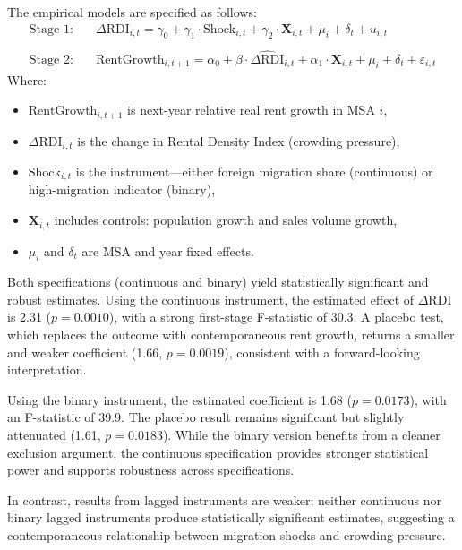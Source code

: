 \documentclass[APA,Times1COL]{WileyNJDv5} %
\begin{document}
The empirical models are specified as follows:
\begin{align*}
	\text{Stage 1:} \quad & \Delta \text{RDI}_{i,t} = \gamma_0 + \gamma_1 \cdot \text{Shock}_{i,t} + \gamma_2 \cdot \mathbf{X}_{i,t} + \mu_i + \delta_t + u_{i,t} \\\\
	\text{Stage 2:} \quad & \text{RentGrowth}_{i,t+1} = \alpha_0 + \beta \cdot \widehat{\Delta \text{RDI}}_{i,t} + \alpha_1 \cdot \mathbf{X}_{i,t} + \mu_i + \delta_t + \varepsilon_{i,t}
\end{align*}
Where:
\begin{itemize}
	\item $\text{RentGrowth}_{i,t+1}$ is next-year relative real rent growth in MSA $i$,
	\item $\Delta \text{RDI}_{i,t}$ is the change in Rental Density Index (crowding pressure),
	\item $\text{Shock}_{i,t}$ is the instrument—either foreign migration share (continuous) or high-migration indicator (binary),
	\item $\mathbf{X}_{i,t}$ includes controls: population growth and sales volume growth,
	\item $\mu_i$ and $\delta_t$ are MSA and year fixed effects.
\end{itemize}


Both specifications (continuous and binary) yield statistically significant and robust estimates. Using the continuous instrument, the estimated effect of \(\Delta \text{RDI}\) is 2.31 (\(p = 0.0010\)), with a strong first-stage F-statistic of 30.3. A placebo test, which replaces the outcome with contemporaneous rent growth, returns a smaller and weaker coefficient (1.66, \(p = 0.0019\)), consistent with a forward-looking interpretation.

Using the binary instrument, the estimated coefficient is 1.68 (\(p = 0.0173\)), with an F-statistic of 39.9. The placebo result remains significant but slightly attenuated (1.61, \(p = 0.0183\)). While the binary version benefits from a cleaner exclusion argument, the continuous specification provides stronger statistical power and supports robustness across specifications.

In contrast, results from lagged instruments are weaker; neither continuous nor binary lagged instruments produce statistically significant estimates, suggesting a contemporaneous relationship between migration shocks and crowding pressure.
\end{document}
